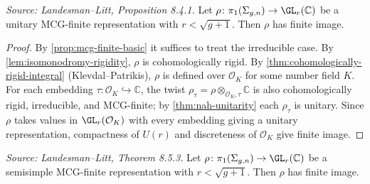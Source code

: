 
\begin{proposition}
  \label{prop:unitary-case}
  \textit{Source: Landesman--Litt, Proposition 8.4.1.}
  Let $\rho\colon \pi_1(\Sigma_{g,n}) \to \GL_r(\mathbb{C})$ be a unitary
  MCG-finite representation with $r < \sqrt{g+1}$.
  Then $\rho$ has finite image.
\end{proposition}

\begin{proof}
  By \cref{prop:mcg-finite-basic} it suffices to treat the irreducible case.
  By \cref{lem:isomonodromy-rigidity}, $\rho$ is cohomologically rigid.
  By \cref{thm:cohomologically-rigid-integral} (Klevdal--Patrikis), $\rho$ is
  defined over $\mathcal{O}_K$ for some number field $K$.
  For each embedding $\tau\colon \mathcal{O}_K \hookrightarrow \mathbb{C}$,
  the twist $\rho_\tau = \rho \otimes_{\mathcal{O}_K,\tau} \mathbb{C}$ is also
  cohomologically rigid, irreducible, and MCG-finite; by
  \cref{thm:nah-unitarity} each $\rho_\tau$ is unitary.
  Since $\rho$ takes values in $\GL_r(\mathcal{O}_K)$ with every embedding
  giving a unitary representation, compactness of $U(r)$ and discreteness of
  $\mathcal{O}_K$ give finite image.
\end{proof}

\begin{theorem}
  \label{thm:semisimple-case}
  \textit{Source: Landesman--Litt, Theorem 8.5.3.}
  Let $\rho\colon \pi_1(\Sigma_{g,n}) \to \GL_r(\mathbb{C})$ be a semisimple
  MCG-finite representation with $r < \sqrt{g+1}$.
  Then $\rho$ has finite image.
\end{theorem}


